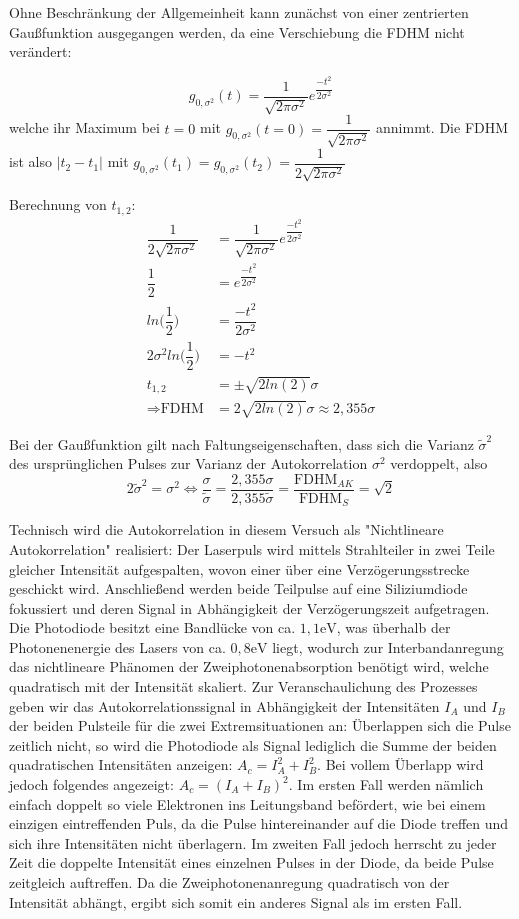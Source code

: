 Ohne Beschränkung der Allgemeinheit kann zunächst von einer zentrierten Gaußfunktion ausgegangen werden, da eine Verschiebung die FDHM nicht verändert:

\[g_{0,\sigma^2}(t)=\dfrac{1}{\sqrt{2\pi\sigma^2}}e^{\dfrac{-t^2}{2\sigma^2}}\]
welche ihr Maximum bei $t=0$ mit $g_{0,\sigma^2}(t=0)=\dfrac{1}{\sqrt{2\pi\sigma^2}}$ annimmt. Die FDHM ist also $|t_{2}-t_{1}|$ mit $g_{0,\sigma^2}(t_{1})=g_{0,\sigma^2}(t_{2})=\dfrac{1}{2\sqrt{2\pi\sigma^2}}$

Berechnung von $t_{1,2}$:
\begin{align*}
\dfrac{1}{2\sqrt{2\pi\sigma^2}}&=\dfrac{1}{\sqrt{2\pi\sigma^2}}e^{\dfrac{-t^2}{2\sigma^2}}\\
\dfrac{1}{2}&=e^{\dfrac{-t^2}{2\sigma^2}}\\
ln\Big(\dfrac{1}{2}\Big)&=\dfrac{-t^2}{2\sigma^2}\\
2\sigma^2ln\Big(\dfrac{1}{2}\Big)&=-t^2\\
t_{1,2}&=\pm\sqrt{2ln(2)}\sigma\\
\Rightarrow \text{FDHM}&=2\sqrt{2ln(2)}\sigma\approx2,355\sigma
\end{align*}

Bei der Gaußfunktion gilt nach Faltungseigenschaften, dass sich die Varianz $\tilde{\sigma}^2$ des ursprünglichen Pulses zur Varianz der Autokorrelation $\sigma^2$ verdoppelt, also
\[2\tilde{\sigma}^2=\sigma^2 \Leftrightarrow \dfrac{\sigma}{\tilde{\sigma}}= \dfrac{2,355\sigma}{2,355\tilde{\sigma}} = \dfrac{\text{FDHM}_{AK}}{\text{FDHM}_{S}}=\sqrt{2}\]

Technisch wird die Autokorrelation in diesem Versuch als "Nichtlineare Autokorrelation"{} realisiert: Der Laserpuls wird mittels Strahlteiler in zwei Teile gleicher Intensität aufgespalten, wovon einer über eine Verzögerungsstrecke geschickt wird. Anschließend werden beide Teilpulse auf eine Siliziumdiode fokussiert und deren Signal in Abhängigkeit der Verzögerungszeit aufgetragen. Die Photodiode besitzt eine Bandlücke von ca. $1,1\si{\electronvolt}$, was überhalb der Photonenenergie des Lasers von ca. $0,8\si{\electronvolt}$ liegt, wodurch zur Interbandanregung das nichtlineare Phänomen der Zweiphotonenabsorption benötigt wird, welche quadratisch mit der Intensität skaliert. Zur Veranschaulichung des Prozesses geben wir das Autokorrelationssignal in Abhängigkeit der Intensitäten $I_{A}$ und $I_{B}$ der beiden Pulsteile für die zwei Extremsituationen an: Überlappen sich die Pulse zeitlich nicht, so wird die Photodiode als Signal lediglich die Summe der beiden quadratischen Intensitäten anzeigen: $A_{c}=I_{A}^2+I_{B}^2$. Bei vollem Überlapp wird jedoch folgendes angezeigt: $A_{c}=(I_{A}+I_{B})^2$. Im ersten Fall werden nämlich einfach doppelt so viele Elektronen ins Leitungsband befördert, wie bei einem einzigen eintreffenden Puls, da die Pulse hintereinander auf die Diode treffen und sich ihre Intensitäten nicht überlagern. Im zweiten Fall jedoch herrscht zu jeder Zeit die doppelte Intensität eines einzelnen Pulses in der Diode, da beide Pulse zeitgleich auftreffen. Da die Zweiphotonenanregung quadratisch von der Intensität abhängt, ergibt sich somit ein anderes Signal als im ersten Fall.

\autocite{Boyd}

